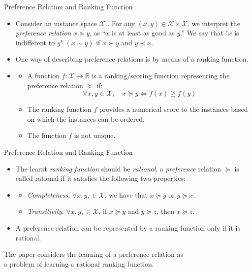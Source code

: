 \documentclass[8pt]{beamer}
\newcommand{\Ytri}{$\triangleright$ }
\renewcommand{\|}[1][.3em]{\hspace{#1}|\hspace{#1}}
\renewcommand{\,}[1][.3em]{,\hspace{#1}}
\newlength{\wideitemsep}
\let\olditem\item
\renewcommand{\item}{\setlength{\itemsep}{\wideitemsep}\olditem}
\newcommand{\subitem}{\item[\Ytri]}
\newcommand{\p}{\emph{preference} }
\newcommand{\m}[1]{\mathcal{#1}}
\newcommand{\e}[1]{{\emph{#1}}}
\renewcommand{\,}{,\hspace{3pt}}
\renewcommand{\|}{\hspace{3pt}|\hspace{3pt}}
\begin{document}
\begin{frame}{Preference Relation and Ranking Function}
    \begin{itemize}
    \item Consider an instance space $\m{X}$ . For any $(x, y) \in \m{X} \times \m{X}$, we interpret the \emph{preference relation} $x \succeq y$, as “$x$ is at least as good as $y$.” We say that "$x$ is indifferent to $y$" $(x \sim y)$ if $x \succ y$ and $y \prec x$.
    \item One way of describing preference relations is by means of a ranking function.
    \item[] \begin{itemize}
        \subitem A function $f : \m{X} \rightarrow \mathbb{R}$  is a ranking/scoring function representing the preference relation $\succeq$ if:
        \begin{equation}\label{eq:ranking_func}
        \forall x, y \in \m{X},\hspace{1em} x \succeq y \Leftrightarrow f(x) \geq f(y)
        \end{equation}
        \subitem The ranking function $f$ provides a numerical score to the instances based on which the instances can be ordered.
        \subitem The function $f$ is not unique.
    \end{itemize}
    \end{itemize}
\end{frame}


\begin{frame}{Preference Relation and Ranking Function}
    \begin{itemize}
    \item The learnt \e{ranking function} should be \e{rational}, a \p relation $\succeq$ is called rational if  it satisfies the following two properties:
    \item[] \begin{itemize}
        \subitem \e{Completeness}. $\forall x, y, \in  \m{X}$, we have that $x \succeq y$ or $y \succeq x$.
        \subitem \e{Transitivity}. $\forall x, y, \in  \m{X}$, if $x \succeq y$ and $y \succeq z$, then $x \succeq z$.
    \end{itemize}
    \item A preference relation can be represented by a ranking function only if it is rational.
    \end{itemize}
    \vspace{3em}
    \begin{block}{}\centering
    The paper considers the learning of a preference relation as\\a problem of learning a rational ranking function.
    \end{block}
\end{frame}
\end{document}
